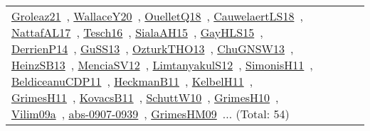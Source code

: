 {\begin{longtable}{lp{3cm}>{\raggedright\arraybackslash}p{6cm}>{\raggedright\arraybackslash}p{6cm}>{\raggedright\arraybackslash}p{8cm}}
\href{works/Groleaz21.pdf}{Groleaz21}~\cite{Groleaz21}, \href{works/WallaceY20.pdf}{WallaceY20}~\cite{WallaceY20}, \href{works/OuelletQ18.pdf}{OuelletQ18}~\cite{OuelletQ18}, \href{works/CauwelaertLS18.pdf}{CauwelaertLS18}~\cite{CauwelaertLS18}, \href{works/NattafAL17.pdf}{NattafAL17}~\cite{NattafAL17}, \href{works/Tesch16.pdf}{Tesch16}~\cite{Tesch16}, \href{works/SialaAH15.pdf}{SialaAH15}~\cite{SialaAH15}, \href{works/GayHLS15.pdf}{GayHLS15}~\cite{GayHLS15}, \href{works/DerrienP14.pdf}{DerrienP14}~\cite{DerrienP14}, \href{works/GuSS13.pdf}{GuSS13}~\cite{GuSS13}, \href{works/OzturkTHO13.pdf}{OzturkTHO13}~\cite{OzturkTHO13}, \href{works/ChuGNSW13.pdf}{ChuGNSW13}~\cite{ChuGNSW13}, \href{works/HeinzSB13.pdf}{HeinzSB13}~\cite{HeinzSB13}, \href{works/MenciaSV12.pdf}{MenciaSV12}~\cite{MenciaSV12}, \href{works/LimtanyakulS12.pdf}{LimtanyakulS12}~\cite{LimtanyakulS12}, \href{works/SimonisH11.pdf}{SimonisH11}~\cite{SimonisH11}, \href{works/BeldiceanuCDP11.pdf}{BeldiceanuCDP11}~\cite{BeldiceanuCDP11}, \href{works/HeckmanB11.pdf}{HeckmanB11}~\cite{HeckmanB11}, \href{works/KelbelH11.pdf}{KelbelH11}~\cite{KelbelH11}, \href{works/GrimesH11.pdf}{GrimesH11}~\cite{GrimesH11}, \href{works/KovacsB11.pdf}{KovacsB11}~\cite{KovacsB11}, \href{works/SchuttW10.pdf}{SchuttW10}~\cite{SchuttW10}, \href{works/GrimesH10.pdf}{GrimesH10}~\cite{GrimesH10}, \href{works/Vilim09a.pdf}{Vilim09a}~\cite{Vilim09a}, \href{works/abs-0907-0939.pdf}{abs-0907-0939}~\cite{abs-0907-0939}, \href{works/GrimesHM09.pdf}{GrimesHM09}~\cite{GrimesHM09}... (Total: 54)\\

\end{longtable}}
